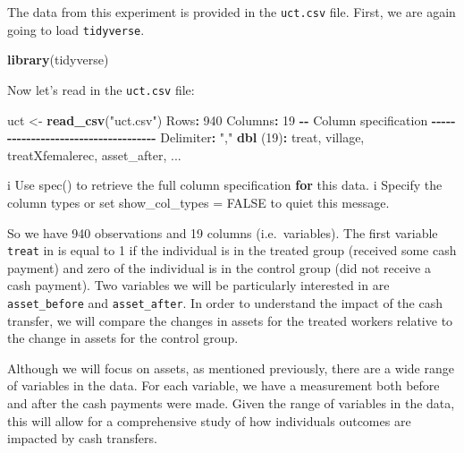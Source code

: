 \documentclass[
]{book}
\newenvironment{Shaded}{\begin{snugshade}}{\end{snugshade}}
\newcommand{\AttributeTok}[1]{\textcolor[rgb]{0.13,0.29,0.53}{#1}}
\newcommand{\ControlFlowTok}[1]{\textcolor[rgb]{0.13,0.29,0.53}{\textbf{#1}}}
\newcommand{\DecValTok}[1]{\textcolor[rgb]{0.00,0.00,0.81}{#1}}
\newcommand{\FunctionTok}[1]{\textcolor[rgb]{0.13,0.29,0.53}{\textbf{#1}}}
\newcommand{\NormalTok}[1]{#1}
\newcommand{\OtherTok}[1]{\textcolor[rgb]{0.56,0.35,0.01}{#1}}
\newcommand{\SpecialCharTok}[1]{\textcolor[rgb]{0.81,0.36,0.00}{\textbf{#1}}}
\newcommand{\StringTok}[1]{\textcolor[rgb]{0.31,0.60,0.02}{#1}}
\begin{document}
The data from this experiment is provided in the \texttt{uct.csv} file. First, we are again going to load \texttt{tidyverse}.

\begin{Shaded}
\begin{Highlighting}[]
\FunctionTok{library}\NormalTok{(tidyverse)}
\end{Highlighting}
\end{Shaded}

Now let's read in the \texttt{uct.csv} file:

\begin{Shaded}
\begin{Highlighting}[]
\NormalTok{uct }\OtherTok{\textless{}{-}} \FunctionTok{read\_csv}\NormalTok{(}\StringTok{"uct.csv"}\NormalTok{)}
\NormalTok{Rows}\SpecialCharTok{:} \DecValTok{940}\NormalTok{ Columns}\SpecialCharTok{:} \DecValTok{19}
\SpecialCharTok{{-}{-}}\NormalTok{ Column specification }\SpecialCharTok{{-}{-}{-}{-}{-}{-}{-}{-}{-}{-}{-}{-}{-}{-}{-}{-}{-}{-}{-}{-}{-}{-}{-}{-}{-}{-}{-}{-}{-}{-}{-}{-}{-}{-}{-}{-}}
\NormalTok{Delimiter}\SpecialCharTok{:} \StringTok{","}
\FunctionTok{dbl}\NormalTok{ (}\DecValTok{19}\NormalTok{)}\SpecialCharTok{:}\NormalTok{ treat, village, treatXfemalerec, asset\_after, ...}

\NormalTok{i Use }\StringTok{\textasciigrave{}}\AttributeTok{spec()}\StringTok{\textasciigrave{}}\NormalTok{ to retrieve the full column specification }\ControlFlowTok{for}\NormalTok{ this data.}
\NormalTok{i Specify the column types or set }\StringTok{\textasciigrave{}}\AttributeTok{show\_col\_types = FALSE}\StringTok{\textasciigrave{}}\NormalTok{ to quiet this message.}
\end{Highlighting}
\end{Shaded}

So we have 940 observations and 19 columns (i.e.~variables). The first variable \texttt{treat} in is equal to 1 if the individual is in the treated group (received some cash payment) and zero of the individual is in the control group (did not receive a cash payment). Two variables we will be particularly interested in are \texttt{asset\_before} and \texttt{asset\_after}. In order to understand the impact of the cash transfer, we will compare the changes in assets for the treated workers relative to the change in assets for the control group.

Although we will focus on assets, as mentioned previously, there are a wide range of variables in the data. For each variable, we have a measurement both before and after the cash payments were made. Given the range of variables in the data, this will allow for a comprehensive study of how individuals outcomes are impacted by cash transfers.
\end{document}
